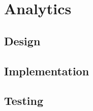 \chapter{Analytics} \label{Chapter: Analytics}

\section{Design}

\section{Implementation}

\section{Testing}
